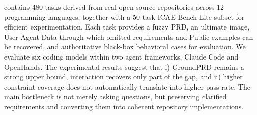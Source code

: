 
\rcb{} contains 480 tasks derived from real open-source repositories across 12 programming languages, together with a 50-task ICAE-Bench-Lite subset for efficient experimentation. Each task provides a fuzzy PRD, an ultimate image, User Agent Data through which omitted requirements and Public examples can be recovered, and authoritative black-box behavioral cases for evaluation. We evaluate six coding models within two agent frameworks, Claude Code and OpenHands. The experimental results suggest that i) GroundPRD remains a strong upper bound, interaction recovers only part of the gap, and ii) higher constraint coverage does not automatically translate into higher pass rate. The main bottleneck is not merely asking questions, but preserving clarified requirements and converting them into coherent repository implementations.


